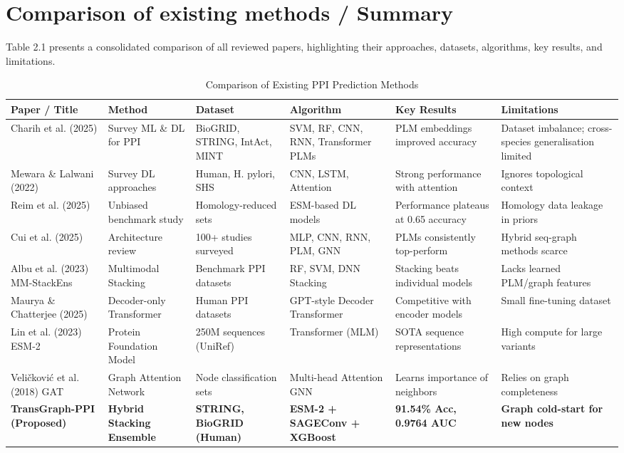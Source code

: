 \documentclass[12pt,a4paper]{report}
\begin{document}
\section{Comparison of existing methods / Summary}
Table 2.1 presents a consolidated comparison of all reviewed papers, highlighting their approaches, datasets, algorithms, key results, and limitations.

\begin{table}
\caption{Comparison of Existing PPI Prediction Methods}
\centering
\small
\renewcommand{\arraystretch}{1.3}
\begin{tabular}{|p{0.12\textheight}|p{0.14\textheight}|p{0.14\textheight}|p{0.14\textheight}|p{0.14\textheight}|p{0.14\textheight}|}
\hline
\textbf{Paper / Title} & \textbf{Method} & \textbf{Dataset} & \textbf{Algorithm} & \textbf{Key Results} & \textbf{Limitations} \\ \hline
Charih et al. (2025) & Survey ML \& DL for PPI & BioGRID, STRING, IntAct, MINT & SVM, RF, CNN, RNN, Transformer PLMs & PLM embeddings improved accuracy & Dataset imbalance; cross-species generalisation limited \\ \hline
Mewara \& Lalwani (2022) & Survey DL approaches & Human, H. pylori, SHS & CNN, LSTM, Attention & Strong performance with attention & Ignores topological context \\ \hline
Reim et al. (2025) & Unbiased benchmark study & Homology-reduced sets & ESM-based DL models & Performance plateaus at 0.65 accuracy & Homology data leakage in priors \\ \hline
Cui et al. (2025) & Architecture review & 100+ studies surveyed & MLP, CNN, RNN, PLM, GNN & PLMs consistently top-perform & Hybrid seq-graph methods scarce \\ \hline
Albu et al. (2023) MM-StackEns & Multimodal Stacking & Benchmark PPI datasets & RF, SVM, DNN Stacking & Stacking beats individual models & Lacks learned PLM/graph features \\ \hline
Maurya \& Chatterjee (2025) & Decoder-only Transformer & Human PPI datasets & GPT-style Decoder Transformer & Competitive with encoder models & Small fine-tuning dataset \\ \hline
Lin et al. (2023) ESM-2 & Protein Foundation Model & 250M sequences (UniRef) & Transformer (MLM) & SOTA sequence representations & High compute for large variants \\ \hline
Veli\v{c}kovi\'{c} et al. (2018) GAT & Graph Attention Network & Node classification sets & Multi-head Attention GNN & Learns importance of neighbors & Relies on graph completeness \\ \hline
\textbf{TransGraph-PPI (Proposed)} & \textbf{Hybrid Stacking Ensemble} & \textbf{STRING, BioGRID (Human)} & \textbf{ESM-2 + SAGEConv + XGBoost} & \textbf{91.54\% Acc, 0.9764 AUC} & \textbf{Graph cold-start for new nodes} \\ \hline
\end{tabular}
\label{tab:comparison}
\end{table}
\end{document}
